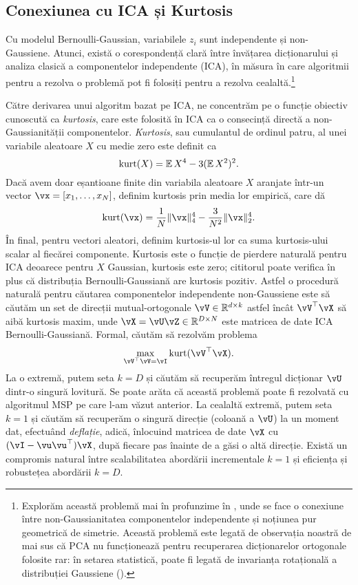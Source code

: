 \documentclass[../../book-main_ro.tex]{subfiles}
\begin{document}
\subsection{Conexiunea cu ICA și Kurtosis}
Cu modelul Bernoulli-Gaussian, variabilele $z_i$ sunt independente și non-Gaussiene. Atunci, există o corespondență clară între învățarea dicționarului și analiza clasică a componentelor independente (ICA), în măsura în care algoritmii pentru a rezolva o problemă pot fi folosiți pentru a rezolva cealaltă.\footnote{Explorăm această problemă mai în profunzime în , unde se face o conexiune între non-Gaussianitatea componentelor independente și noțiunea pur geometrică de simetrie. Această problemă este legată de observația noastră de mai sus că PCA nu funcționează pentru recuperarea dicționarelor ortogonale folosite rar: în setarea statistică, poate fi legată de invarianța rotațională a distribuției Gaussiene ().} 


Către derivarea unui algoritm bazat pe ICA, ne concentrăm pe o funcție obiectiv cunoscută ca \textit{kurtosis}, care este folosită în ICA ca o consecință directă a non-Gaussianității componentelor. \textit{Kurtosis}, sau cumulantul de ordinul patru, al unei variabile aleatoare $X$ cu medie zero este definit ca
\begin{equation}\label{eq:kurtosis}
\mathop{\mathrm{kurt}}(X) = \operatorname{\mathbb{E}}{X^4} - 3 (\operatorname{\mathbb{E}}{X^2})^2.
\end{equation}
Dacă avem doar eșantioane finite din variabila aleatoare $X$ aranjate într-un vector $\vx = [x_1, \dots, x_N]$, definim kurtosis prin media lor empirică, care dă
\begin{equation}\label{eq:kurtosis-vector}
\kurt(\vx) = \frac{1}{N} \norm{\vx}_4^4 - \frac{3}{N^2} \norm{\vx}_2^4.
\end{equation}
În final, pentru vectori aleatori, definim kurtosis-ul lor ca suma kurtosis-ului scalar al fiecărei componente.
Kurtosis este o funcție de pierdere naturală pentru ICA deoarece pentru $X$ Gaussian, kurtosis este zero; cititorul poate verifica în plus că distribuția Bernoulli-Gaussiană are kurtosis pozitiv.
Astfel o procedură naturală pentru căutarea componentelor independente non-Gaussiene este să căutăm un set de direcții mutual-ortogonale $\vV \in \R^{d \times k}$ astfel încât $\vV^\top \vX$ să aibă kurtosis maxim, unde $\vX = \vU \vZ \in \R^{D \times N}$ este matricea de date ICA Bernoulli-Gaussiană.
Formal, căutăm să rezolvăm problema
\begin{equation}
    \max_{\vV^\top \vV = \vI} \kurt(\vV^\top \vX).
\end{equation}
La o extremă, putem seta $k = D$ și căutăm să recuperăm întregul dicționar
$\vU$ dintr-o singură lovitură. Se poate arăta că această problemă poate fi rezolvată cu
algoritmul MSP pe care l-am văzut anterior.
La cealaltă extremă, putem seta $k=1$ și căutăm să recuperăm o singură direcție (coloană a $\vU$) la un moment dat, efectuând \textit{deflație}, adică, înlocuind matricea de date $\vX$ cu $(\vI - \vu\vu^\top) \vX$, după fiecare pas înainte de a găsi o altă direcție.
Există un compromis natural între scalabilitatea abordării incrementale $k=1$ și eficiența și robustețea abordării $k=D$.
\end{document}
